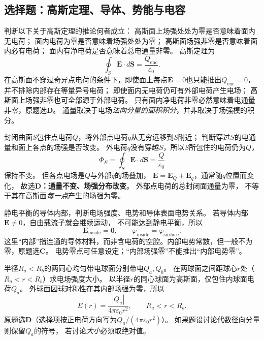 

\subsection{选择题：高斯定理、导体、势能与电容}

\problemtext 判断以下关于高斯定理的推论何者成立：
高斯面上场强处处为零是否意味着面内无电荷；
面内电荷为零是否意味着场强处处为零；
高斯面场强非零是否意味着面内必有电荷；
面内有净电荷是否意味着总电通量非零。
\workings
高斯定理为
\[
\oint_S\bm E\cdot d\bm S=\frac{Q_{\mathrm{enc}}}{\varepsilon_0}.
\]
在高斯面不穿过奇异点电荷的条件下，即使面上每点$\bm E=0$也只能推出$Q_{\mathrm{enc}}=0$，并不排除内部存在等量异号电荷；
即使面内无电荷仍可有外部电荷产生电场；
高斯面上场强非零也可全部源于外部电荷。
只有面内净电荷非零必然意味着电通量非零，原题选\textbf{D}。
\crosscheck 通量取决于电场\emph{法向分量的面积积分}，并非取决于场强模的积分。

\problemtext 封闭曲面$S$包住点电荷$Q$，将外部点电荷$q$从无穷远移到$S$附近；
判断穿过$S$的电通量和面上各点的场强是否改变。
\workings
外电荷$q$没有穿越$S$，所以$S$所包住的电荷仍为$Q$，
\[
\boxed{\Phi_E=\oint_S\bm E\cdot d\bm S
=\frac{Q}{\varepsilon_0}}
\]
保持不变。
但各点电场是$Q$与外部$q$的场叠加，
$\bm E=\bm E_Q+\bm E_q$，通常随$q$位置而变化，
故选\textbf{D：通量不变、场强分布改变}。
\crosscheck 外部点电荷的总封闭面通量为零，
不等于其在高斯面\emph{每一点}产生的场强为零。

\problemtext 静电平衡的导体内部，判断电场强度、电势和导体表面电势关系。
\workings
若导体内部$\bm E\ne0$，自由载流子就会继续运动，
不可能达到静电平衡，所以
\[
\boxed{\bm E_{\mathrm{inside}}=\bm0,\qquad
\varphi_{\mathrm{inside}}=\varphi_{\mathrm{surface}}}.
\]
这里“内部”指连通的导体材料，而非含电荷的空腔。内部电势常数，但一般不为零，原题选\textbf{C}。
\crosscheck 电势零点可任意设定；“内部场强零”不能推出“内部电势零”。

\problemtext 半径$R_a<R_b$的两同心均匀带电球面分别带电$Q_a,Q_b$。
在两球面之间距球心$r$处（$R_a<r<R_b$）求电场强度大小。
\workings
以半径$r$的同心球面为高斯面，仅包住内球面电荷$Q_a$。
外球面因球对称性在其内部场强为零，所以
\[
\boxed{E(r)=\frac{|Q_a|}{4\pi\varepsilon_0r^2}},\qquad
R_a<r<R_b.
\]
原题选\textbf{D}（选择项按正电荷方向写为$Q_a/(4\pi\varepsilon_0r^2)$）。
\crosscheck 如果题设讨论代数径向分量则保留$Q_a$的符号，
若讨论\emph{大小}必须取绝对值。


